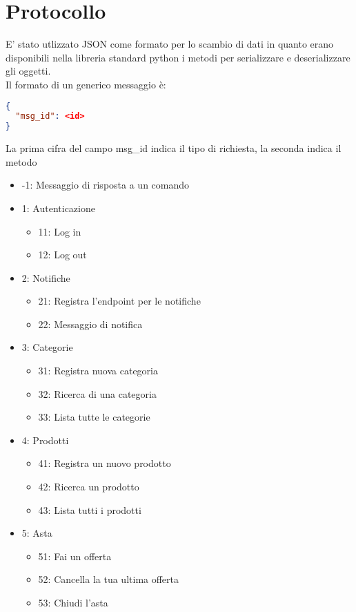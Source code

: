 \section{Protocollo}
E' stato utlizzato JSON come formato per lo scambio di dati in quanto erano disponibili nella libreria standard python i metodi per serializzare e deserializzare gli oggetti.\\

Il formato di un generico  messaggio è:
\begin{lstlisting}[language=json]
{
  "msg_id": <id>
}
\end{lstlisting}
La prima cifra del campo msg\_id indica il tipo di richiesta, la seconda indica il metodo
\begin{itemize}
\item -1: Messaggio di risposta a un comando
\item 1: Autenticazione
\begin{itemize}
\item 11: Log in
\item 12: Log out
\end{itemize}
\item 2: Notifiche
\begin{itemize}
\item 21: Registra l'endpoint per le notifiche
\item 22: Messaggio di notifica
\end{itemize}
\item 3: Categorie
\begin{itemize}
\item 31: Registra nuova categoria
\item 32: Ricerca di una categoria
\item 33: Lista tutte le categorie
\end{itemize}
\item 4: Prodotti
\begin{itemize}
\item 41: Registra un nuovo prodotto
\item 42: Ricerca un prodotto
\item 43: Lista tutti i prodotti
\end{itemize}
\item 5: Asta
\begin{itemize}
\item 51: Fai un offerta
\item 52: Cancella la tua ultima offerta
\item 53: Chiudi l'asta

\end{itemize}

\end{itemize}

